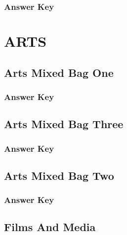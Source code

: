 \documentclass[12pt,a4paper]{book}
\begin{document}
\subsection*{Answer Key}



\chapter{ARTS}

\section{Arts Mixed Bag One}



\subsection*{Answer Key}



\section{Arts Mixed Bag Three}



\subsection*{Answer Key}



\section{Arts Mixed Bag Two}



\subsection*{Answer Key}



\section{Films And Media}
\end{document}
